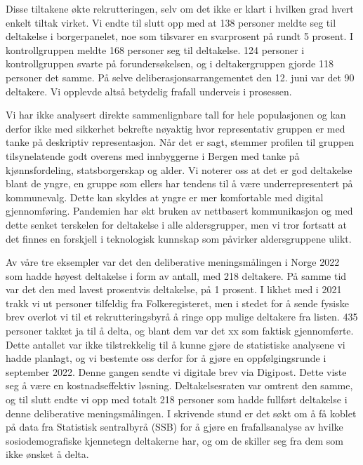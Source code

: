 \documentclass[
  12pt,
  a4paper, 12pt]{article}
\begin{document}
Disse tiltakene økte rekrutteringen, selv om det ikke er klart i hvilken grad hvert enkelt tiltak virket. Vi endte til slutt opp med at 138 personer meldte seg til deltakelse i borgerpanelet, noe som tilsvarer en svarprosent på rundt 5 prosent. I kontrollgruppen meldte 168 personer seg til deltakelse. 124 personer i kontrollgruppen svarte på forundersøkelsen, og i deltakergruppen gjorde 118 personer det samme. På selve deliberasjonsarrangementet den 12. juni var det 90 deltakere. Vi opplevde altså betydelig frafall underveis i prosessen.

Vi har ikke analysert direkte sammenlignbare tall for hele populasjonen og kan derfor ikke med sikkerhet bekrefte nøyaktig hvor representativ gruppen er med tanke på deskriptiv representasjon. Når det er sagt, stemmer profilen til gruppen tilsynelatende godt overens med innbyggerne i Bergen med tanke på kjønnsfordeling, statsborgerskap og alder. Vi noterer oss at det er god deltakelse blant de yngre, en gruppe som ellers har tendens til å være underrepresentert på kommunevalg. Dette kan skyldes at yngre er mer komfortable med digital gjennomføring. Pandemien har økt bruken av nettbasert kommunikasjon og med dette senket terskelen for deltakelse i alle aldersgrupper, men vi tror fortsatt at det finnes en forskjell i teknologisk kunnskap som påvirker aldersgruppene ulikt.

Av våre tre eksempler var det den deliberative meningsmålingen i Norge 2022 som hadde høyest deltakelse i form av antall, med 218 deltakere. På samme tid var det den med lavest prosentvis deltakelse, på 1 prosent. I likhet med i 2021 trakk vi ut personer tilfeldig fra Folkeregisteret, men i stedet for å sende fysiske brev overlot vi til et rekrutteringsbyrå å ringe opp mulige deltakere fra listen. 435 personer takket ja til å delta, og blant dem var det xx som faktisk gjennomførte. Dette antallet var ikke tilstrekkelig til å kunne gjøre de statistiske analysene vi hadde planlagt, og vi bestemte oss derfor for å gjøre en oppfølgingsrunde i september 2022. Denne gangen sendte vi digitale brev via Digipost. Dette viste seg å være en kostnadseffektiv løsning. Deltakelsesraten var omtrent den samme, og til slutt endte vi opp med totalt 218 personer som hadde fullført deltakelse i denne deliberative meningsmålingen. I skrivende stund er det søkt om å få koblet på data fra Statistisk sentralbyrå (SSB) for å gjøre en frafallsanalyse av hvilke sosiodemografiske kjennetegn deltakerne har, og om de skiller seg fra dem som ikke ønsket å delta.

\newpage
\end{document}
